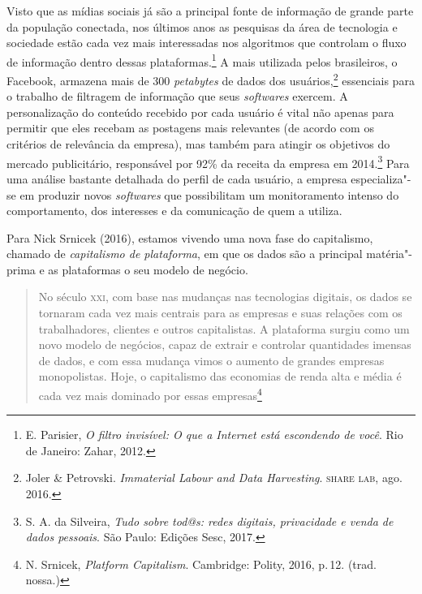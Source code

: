 Visto que as mídias sociais já são a principal fonte de informação de
grande parte da população conectada, nos últimos anos as pesquisas da
área de tecnologia e sociedade estão cada vez mais interessadas nos
algoritmos que controlam o fluxo de informação dentro dessas plataformas.\footnote{E. Parisier, \textit{O filtro invisível: O que a Internet está escondendo
de você}. Rio de Janeiro: Zahar, 2012.}
A mais utilizada pelos brasileiros, o Facebook,
armazena mais de 300 \textit{petabytes} de dados dos usuários,\footnote{Joler \& Petrovski. \textit{Immaterial Labour and Data Harvesting}. \textsc{share lab}, ago. 2016.}
essenciais para o trabalho de filtragem de informação que seus \textit{softwares} exercem. A personalização do conteúdo recebido por cada usuário é vital
não apenas para permitir que eles recebam as postagens mais relevantes
(de acordo com os critérios de relevância da empresa), mas também para
atingir os objetivos do mercado publicitário, responsável por 92\% da
receita da empresa em 2014.\footnote{S. A. da Silveira, \textit{Tudo sobre tod@s: redes digitais, privacidade e venda de dados pessoais}. São Paulo: Edições Sesc, 2017.} Para uma análise bastante
detalhada do perfil de cada usuário, a empresa especializa"-se em
produzir novos \textit{softwares} que possibilitam um monitoramento intenso do
comportamento, dos interesses e da comunicação de quem a utiliza.

Para Nick Srnicek (2016), estamos vivendo uma nova fase do capitalismo,
chamado de \textit{capitalismo de plataforma}, em que os dados são a
principal matéria"-prima e as plataformas o seu modelo de negócio.

\begin{quote}
No século \textsc{xxi}, com base nas mudanças nas tecnologias digitais, os dados
se tornaram cada vez mais centrais para as empresas e suas relações com
os trabalhadores, clientes e outros capitalistas. A plataforma surgiu
como um novo modelo de negócios, capaz de extrair e controlar
quantidades imensas de dados, e com essa mudança vimos o aumento de
grandes empresas monopolistas. Hoje, o capitalismo das economias de
renda alta e média é cada vez mais dominado por essas empresas\footnote{N. Srnicek, \textit{Platform Capitalism}. Cambridge: Polity, 2016, p.\,12. (trad. nossa.)}
\end{quote}

